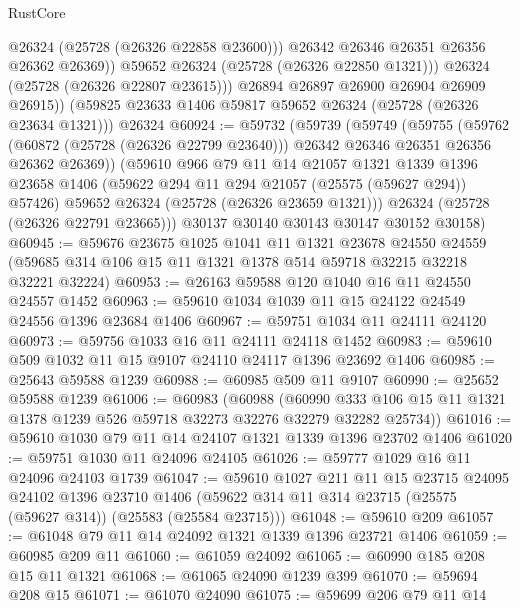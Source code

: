 \begin{lexlean}{RustCore}
\begin{coremodule}
                  @26324
                  (@25728 (@26326 @22858 @23600)))
                @26342
                @26346
                @26351
                @26356
                @26362
                @26369))
            @59652
            @26324
            (@25728 (@26326 @22850 @1321)))
          @26324
          (@25728 (@26326 @22807 @23615)))
        @26894
        @26897
        @26900
        @26904
        @26909
        @26915))
    (@59825 @23633 @1406 @59817 @59652 @26324 (@25728 (@26326 @23634 @1321)))
    @26324
@60924 := @59732
    (@59739
      (@59749
        (@59755
          (@59762
            (@60872 (@25728 (@26326 @22799 @23640)))
            @26342
            @26346
            @26351
            @26356
            @26362
            @26369))
        (@59610
          @966
          @79
          @11
          @14
          @21057
          @1321
          @1339
          @1396
          @23658
          @1406
          (@59622 @294 @11 @294 @21057 (@25575 (@59627 @294)) @57426)
          @59652
          @26324
          (@25728 (@26326 @23659 @1321)))
        @26324
        (@25728 (@26326 @22791 @23665)))
      @30137
      @30140
      @30143
      @30147
      @30152
      @30158)
@60945 := @59676
    @23675
    @1025
    @1041
    @11
    @1321
    @23678
    @24550
    @24559
    (@59685 @314 @106 @15 @11 @1321 @1378 @514 @59718 @32215 @32218 @32221 @32224)
@60953 := @26163 @59588 @120 @1040 @16 @11 @24550 @24557 @1452
@60963 := @59610 @1034 @1039 @11 @15 @24122 @24549 @24556 @1396 @23684 @1406
@60967 := @59751 @1034 @11 @24111 @24120
@60973 := @59756 @1033 @16 @11 @24111 @24118 @1452
@60983 := @59610 @509 @1032 @11 @15 @9107 @24110 @24117 @1396 @23692 @1406
@60985 := @25643 @59588 @1239
@60988 := @60985 @509 @11 @9107
@60990 := @25652 @59588 @1239
@61006 := @60983
    (@60988
      (@60990 @333 @106 @15 @11 @1321 @1378 @1239 @526 @59718 @32273 @32276 @32279 @32282 @25734))
@61016 := @59610 @1030 @79 @11 @14 @24107 @1321 @1339 @1396 @23702 @1406
@61020 := @59751 @1030 @11 @24096 @24105
@61026 := @59777 @1029 @16 @11 @24096 @24103 @1739
@61047 := @59610
    @1027
    @211
    @11
    @15
    @23715
    @24095
    @24102
    @1396
    @23710
    @1406
    (@59622 @314 @11 @314 @23715 (@25575 (@59627 @314)) (@25583 (@25584 @23715)))
@61048 := @59610 @209
@61057 := @61048 @79 @11 @14 @24092 @1321 @1339 @1396 @23721 @1406
@61059 := @60985 @209 @11
@61060 := @61059 @24092
@61065 := @60990 @185 @208 @15 @11 @1321
@61068 := @61065 @24090 @1239 @399
@61070 := @59694 @208 @15
@61071 := @61070 @24090
@61075 := @59699 @206 @79 @11 @14

\end{coremodule}
\end{lexlean}
